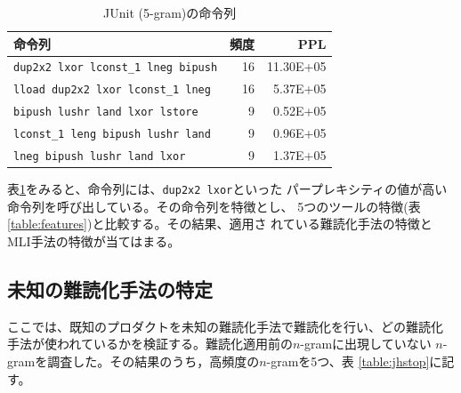 \documentclass[a4j,fleqn,10pt]{jarticle}
\begin{document}
\begin{table}[t]
  \centering
  \footnotesize{
    \caption{JUnit (5-gram)の命令列}\label{table:junit}
  \begin{tabular}{l|r|r}
    命令列 & 頻度 & PPL \\ \hline
    \texttt{dup2x2 lxor lconst\_1 lneg bipush}   & 16 & 11.30E+05 \\
    \texttt{lload dup2x2 lxor lconst\_1 lneg}    & 16 &  5.37E+05 \\
    \texttt{bipush lushr land lxor lstore}       &  9 &  0.52E+05 \\
    \texttt{lconst\_1 leng bipush lushr land}    &  9 &  0.96E+05 \\
    \texttt{lneg bipush lushr land lxor}         &  9 &  1.37E+05 \\
  \end{tabular}}
\end{table}

表\ref{table:junit}をみると、命令列には、\texttt{dup2x2 lxor}といった
パープレキシティの値が高い命令列を呼び出している。その命令列を特徴とし、
5つのツールの特徴(表\ref{table:features})と比較する。その結果、適用さ
れている難読化手法の特徴とMLI手法の特徴が当てはまる。

\subsection{未知の難読化手法の特定}

ここでは、既知のプロダクトを未知の難読化手法で難読化を行い、どの難読化
手法が使われているかを検証する。難読化適用前の$n$-gramに出現していない
$n$-gramを調査した。その結果のうち，高頻度の$n$-gramを5つ、表
\ref{table:jhstop}に記す。
\end{document}
